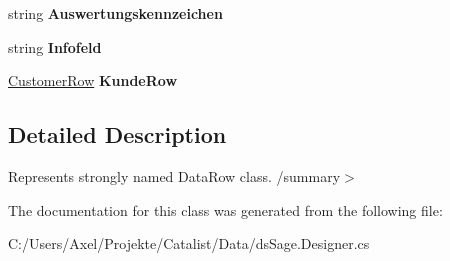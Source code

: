 \begin{DoxyCompactItemize}
\item 
string {\bfseries Auswertungskennzeichen}\hypertarget{class_products_1_1_data_1_1ds_sage_1_1_customer_contact_row_a9306fc1062e24de1fad8ab51f7f95a89}{}\label{class_products_1_1_data_1_1ds_sage_1_1_customer_contact_row_a9306fc1062e24de1fad8ab51f7f95a89}

\item 
string {\bfseries Infofeld}\hypertarget{class_products_1_1_data_1_1ds_sage_1_1_customer_contact_row_a408c507c6d6fd74e6356e0f287982fed}{}\label{class_products_1_1_data_1_1ds_sage_1_1_customer_contact_row_a408c507c6d6fd74e6356e0f287982fed}

\item 
\hyperlink{class_products_1_1_data_1_1ds_sage_1_1_customer_row}{Customer\+Row} {\bfseries Kunde\+Row}\hypertarget{class_products_1_1_data_1_1ds_sage_1_1_customer_contact_row_a72100bce779580a6ee884fa33cbf8596}{}\label{class_products_1_1_data_1_1ds_sage_1_1_customer_contact_row_a72100bce779580a6ee884fa33cbf8596}

\end{DoxyCompactItemize}


\subsection{Detailed Description}
Represents strongly named Data\+Row class. /summary$>$ 

The documentation for this class was generated from the following file\+:\begin{DoxyCompactItemize}
\item 
C\+:/\+Users/\+Axel/\+Projekte/\+Catalist/\+Data/ds\+Sage.\+Designer.\+cs\end{DoxyCompactItemize}
